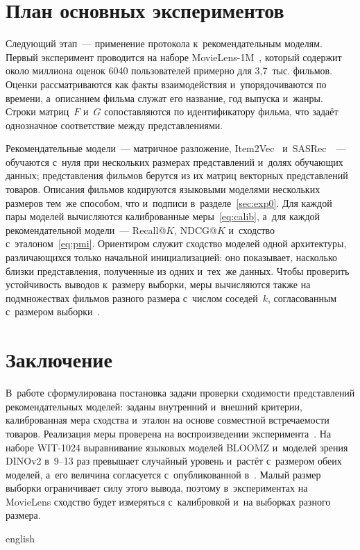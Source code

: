 \documentclass[a4paper,12pt]{article}
\begin{document}
\section{План основных экспериментов}\label{sec:plan}

Следующий этап~--- применение протокола к~рекомендательным моделям. Первый эксперимент
проводится на наборе \mbox{MovieLens-1M}~\cite{harper2015movielens}, который содержит около
миллиона оценок 6040 пользователей примерно для 3,7~тыс. фильмов. Оценки
рассматриваются как факты взаимодействия и~упорядочиваются по времени, а~описанием
фильма служат его название, год выпуска и~жанры. Строки матриц~$F$ и~$G$ сопоставляются
по идентификатору фильма, что задаёт однозначное соответствие между представлениями.

Рекомендательные модели~--- матричное разложение, Item2Vec~\cite{barkan2016item2vec}
и~SASRec~\cite{kang2018sasrec}~--- обучаются с~нуля при нескольких размерах
представлений и~долях обучающих данных; представления фильмов берутся из их матриц
векторных представлений товаров. Описания фильмов кодируются языковыми моделями
нескольких размеров тем~же способом, что и~подписи в~разделе~\ref{sec:exp0}. Для каждой
пары моделей вычисляются калиброванные меры~\eqref{eq:calib}, а~для каждой
рекомендательной модели~--- Recall@$K$, NDCG@$K$ и~сходство с~эталоном~\eqref{eq:pmi}.
Ориентиром служит сходство моделей одной архитектуры, различающихся только начальной
инициализацией: оно показывает, насколько близки представления, полученные из одних
и~тех~же данных. Чтобы проверить устойчивость выводов к~размеру выборки, меры
вычисляются также на подмножествах фильмов разного размера с~числом соседей~$k$,
согласованным с~размером выборки~\cite{koepke2026cave}.

\section{Заключение}

В~работе сформулирована постановка задачи проверки сходимости представлений
рекомендательных моделей: заданы внутренний и~внешний критерии, калиброванная мера
сходства и~эталон на основе совместной встречаемости товаров. Реализация меры
проверена на воспроизведении эксперимента~\cite{huh2024platonic}. На наборе \mbox{WIT-1024}
выравнивание языковых моделей BLOOMZ и~моделей зрения DINOv2 в~9--13 раз превышает
случайный уровень и~растёт с~размером обеих моделей, а~его величина согласуется
с~опубликованной в~\cite{koepke2026cave}. Малый размер выборки ограничивает силу этого
вывода, поэтому в~экспериментах на MovieLens сходство будет измеряться с~калибровкой
и~на выборках разного размера.

\FloatBarrier
\begin{otherlanguage*}{english}


\end{otherlanguage*}
\end{document}
